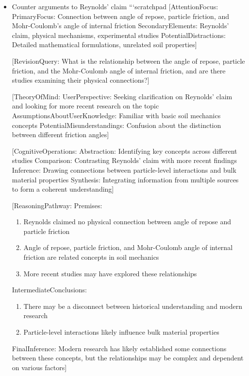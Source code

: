 \documentclass[xcolor=dvipsnames,10pt,hidelinks]{article}
\begin{document}
\begin{itemize}
Citations:
\begin{enumerate}
\item \url{https://civiltoday.com/geotechnical-engineering/soil-mechanics/144-boussinesqs-equation}
\item \url{https://www.cyut.edu.tw/\~jrlai/CE7332/Chap8.pdf}
\item \url{https://www.rocscience.com/help/settle3/documentation/project-settings/stress-computation}
\item \url{https://www.sciencedirect.com/science/article/abs/pii/S0032591020311256}
\item \url{https://testbook.com/civil-engineering/boussinesqs-equation-definition-and-hypothesis}
\end{enumerate}
\item Counter arguments to Reynolds' claim
\label{sec:org07ae7c7}
```scratchpad
{[}AttentionFocus:
PrimaryFocus: Connection between angle of repose, particle friction, and Mohr-Coulomb's angle of internal friction
SecondaryElements: Reynolds' claim, physical mechanisms, experimental studies
PotentialDistractions: Detailed mathematical formulations, unrelated soil properties]

{[}RevisionQuery: What is the relationship between the angle of repose, particle friction, and the Mohr-Coulomb angle of internal friction, and are there studies examining their physical connections?]

{[}TheoryOfMind:
UserPerspective: Seeking clarification on Reynolds' claim and looking for more recent research on the topic
AssumptionsAboutUserKnowledge: Familiar with basic soil mechanics concepts
PotentialMisunderstandings: Confusion about the distinction between different friction angles]

{[}CognitiveOperations:
Abstraction: Identifying key concepts across different studies
Comparison: Contrasting Reynolds' claim with more recent findings
Inference: Drawing connections between particle-level interactions and bulk material properties
Synthesis: Integrating information from multiple sources to form a coherent understanding]

{[}ReasoningPathway:
Premises:
\begin{enumerate}
\item Reynolds claimed no physical connection between angle of repose and particle friction
\item Angle of repose, particle friction, and Mohr-Coulomb angle of internal friction are related concepts in soil mechanics
\item More recent studies may have explored these relationships
\end{enumerate}
IntermediateConclusions:
\begin{enumerate}
\item There may be a disconnect between historical understanding and modern research
\item Particle-level interactions likely influence bulk material properties
\end{enumerate}
FinalInference: Modern research has likely established some connections between these concepts, but the relationships may be complex and dependent on various factors]


\end{itemize}
\end{document}
